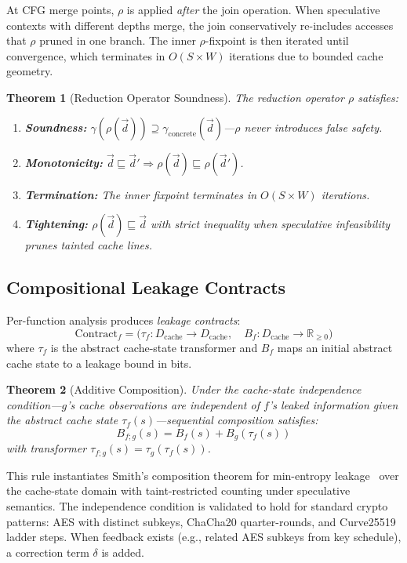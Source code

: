 \documentclass{article}
\newtheorem{theorem}{Theorem}[section]
\theoremstyle{definition}
\theoremstyle{remark}
\newcommand{\Dcache}{D_{\text{cache}}}
\newcommand{\Bf}{B_f}
\newcommand{\Bg}{B_g}
\newcommand{\tauf}{\tau_f}
\newcommand{\taug}{\tau_g}
\begin{document}
At CFG merge points, $\rho$ is applied \emph{after} the join operation.  When
speculative contexts with different depths merge, the join conservatively
re-includes accesses that $\rho$ pruned in one branch.  The inner $\rho$-fixpoint
is then iterated until convergence, which terminates in $O(S \times W)$
iterations due to bounded cache geometry.

\begin{theorem}[Reduction Operator Soundness]
\label{thm:rho-sound}
The reduction operator $\rho$ satisfies:
\begin{enumerate}[nosep]
  \item \textbf{Soundness:} $\gamma(\rho(\vec{d})) \supseteq \gamma_{\text{concrete}}(\vec{d})$---$\rho$ never introduces false safety.
  \item \textbf{Monotonicity:} $\vec{d} \sqsubseteq \vec{d}' \Rightarrow \rho(\vec{d}) \sqsubseteq \rho(\vec{d}')$.
  \item \textbf{Termination:} The inner fixpoint terminates in $O(S \times W)$ iterations.
  \item \textbf{Tightening:} $\rho(\vec{d}) \sqsubseteq \vec{d}$ with strict inequality when speculative infeasibility prunes tainted cache lines.
\end{enumerate}
\end{theorem}

\subsection{Compositional Leakage Contracts}
\label{sec:composition}

Per-function analysis produces \emph{leakage contracts}:
\[
  \text{Contract}_f = \bigl(\tauf : \Dcache \to \Dcache,\quad \Bf : \Dcache \to \mathbb{R}_{\geq 0}\bigr)
\]
where $\tauf$ is the abstract cache-state transformer and $\Bf$ maps an initial
abstract cache state to a leakage bound in bits.

\begin{theorem}[Additive Composition]
\label{thm:composition}
Under the cache-state independence condition---$g$'s cache observations are
independent of $f$'s leaked information given the abstract cache state
$\tauf(s)$---sequential composition satisfies:
\[
  B_{f;g}(s) = \Bf(s) + \Bg(\tauf(s))
\]
with transformer $\tau_{f;g}(s) = \taug(\tauf(s))$.
\end{theorem}

This rule instantiates Smith's composition theorem for min-entropy
leakage~\cite{smith2009foundations} over the cache-state domain with
taint-restricted counting under speculative semantics.  The independence
condition is validated to hold for standard crypto patterns: AES with distinct
subkeys, ChaCha20 quarter-rounds, and Curve25519 ladder steps.  When feedback
exists (e.g., related AES subkeys from key schedule), a correction term $\delta$
is added.
\end{document}
